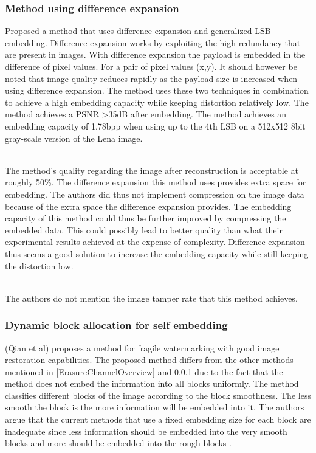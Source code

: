 \documentclass[12pt]{article}
\begin{document}
\subsubsection{Method using difference expansion}
\label{differenceExpansionOverview}
\cite {tian2003high} Proposed a method that uses difference expansion and generalized LSB embedding.
Difference expansion works by exploiting the high redundancy that are present in images.
With difference expansion the payload is embedded in the difference of pixel values. 
For a pair of pixel values (x,y). \cite {tian2002reversible}
It should however be noted that image quality reduces rapidly as the payload size is increased when using difference expansion. 
The method uses these two techniques in combination to achieve a high embedding capacity while keeping distortion relatively low.
The method achieves a PSNR \textgreater 35dB after embedding.
The method achieves an embedding capacity of 1.78bpp when using up to the 4th LSB on a 512x512 8bit gray-scale version of the Lena image.

\hspace{0pt} \\
The method's \cite {tian2003high} quality regarding the image after reconstruction is acceptable at roughly 50\%. 
The difference expansion this method uses provides extra space for embedding.
The authors did thus not implement compression on the image data because of the extra space the difference expansion provides.
The embedding capacity of this method could thus be further improved by compressing the embedded data. 
This could possibly lead to better quality than what their experimental results achieved at the expense of complexity.
Difference expansion thus seems a good solution to increase the embedding capacity while still keeping the distortion low.

\hspace{0pt} \\ 
The authors do not mention the image tamper rate that this method \cite {tian2003high} achieves.

\subsubsection{Dynamic block allocation for self embedding}
\label{DynamicBlockOverview}
(Qian et al) \cite{qian2011image} proposes a method for fragile watermarking with good image restoration capabilities.
The proposed method differs from the other methods mentioned in \ref{ErasureChannelOverview} and \ref{differenceExpansionOverview} due to the fact that the method does not embed the information into all blocks uniformly.
The method classifies different blocks of the image according to the block smoothness.
The less smooth the block is the more information will be embedded into it.
The authors argue that the current methods that use a fixed embedding size for each block are inadequate since less information should be embedded into the very smooth blocks and more should be embedded into the rough blocks \cite{qian2011image}.
\end{document}
